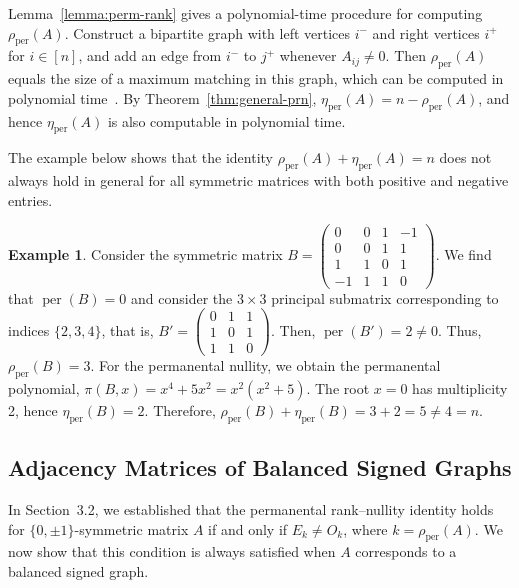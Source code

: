 \documentclass[11pt]{article}
\DeclareMathOperator{\per}{per}
\theoremstyle{plain}
\theoremstyle{definition}
\newtheorem{example}[theorem]{Example}
\theoremstyle{remark}
\begin{document}
Lemma~\ref{lemma:perm-rank} gives a polynomial-time procedure for computing
\(\rho_{\per}(A)\).
Construct a bipartite graph with left vertices \(i^{-}\) and right vertices
\(i^{+}\) for \(i\in[n]\), and add an edge from \(i^{-}\) to \(j^{+}\) whenever
\(A_{ij}\neq 0\).
Then \(\rho_{\per}(A)\) equals the size of a maximum matching in this graph, which
can be computed in polynomial time~\cite{hopcroft1973n}.
By Theorem~\ref{thm:general-prn}, \(\eta_{\per}(A)=n-\rho_{\per}(A)\), and hence
\(\eta_{\per}(A)\) is also computable in polynomial time.



The example below shows that the identity 
\(
\rho_{\mathrm{per}}(A) + \eta_{\mathrm{per}}(A) = n
\)
does not always hold in general for all symmetric matrices with both positive and negative entries. 

\begin{example}
Consider the symmetric matrix
\(
B = \begin{pmatrix}
0  & 0  & 1  & -1 \\
0  & 0  & 1  & 1  \\
1  & 1  & 0  & 1  \\
-1 & 1  & 1  & 0
\end{pmatrix}
\). We find that \(
\per(B) = 0
\)
and consider the \(3 \times 3\) principal submatrix corresponding to indices \(\{2,3,4\}\), that is,
\(
B' = \begin{pmatrix}
0 & 1 & 1 \\
1 & 0 & 1 \\
1 & 1 & 0
\end{pmatrix}.
\) Then,
\(
\per(B') = 2 \neq 0.
\)
Thus,
\(
\rho_{\per}(B) = 3.
\)
For the permanental nullity, we obtain the permanental polynomial,
\(
\pi(B,x) = x^4 + 5x^2 = x^2(x^2 + 5).
\)
The root \(x = 0\) has multiplicity 2, hence
\(
\eta_{\per}(B) = 2.
\)
Therefore,
\(
\rho_{\per}(B) + \eta_{\per}(B) = 3 + 2 = 5 \neq 4 = n.
\)

\end{example}


\subsection{Adjacency Matrices of Balanced Signed Graphs}



In Section~3.2, we established that the permanental rank–nullity identity holds for $\{0,\pm1\}$-symmetric matrix \(A\) if and only if \(E_k \neq O_k\), where \(k = \rho_{\mathrm{per}}(A)\). We now show that this condition is always satisfied when \(A\) corresponds to a balanced signed graph.
\end{document}
